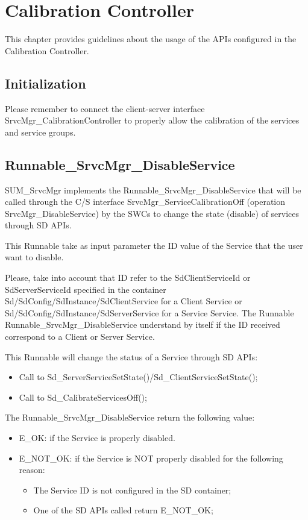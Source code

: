 \chapter{Calibration Controller}
\label{CalContr}

This chapter provides guidelines about the usage of the APIs configured in the Calibration Controller.

\section{Initialization}
Please remember to connect the client-server interface SrvcMgr\_CalibrationController to properly allow the calibration of the services and service groups.

\section{Runnable\_SrvcMgr\_DisableService}
SUM\_SrvcMgr implements the Runnable\_SrvcMgr\_DisableService that will be called through the C/S interface SrvcMgr\_ServiceCalibrationOff (operation SrvcMgr\_DisableService) 
by the SWCs to change the state (disable) of services through SD APIs.

This Runnable take as input parameter the ID value of the Service that the user want to disable. 

Please, take into account that ID refer to the SdClientServiceId or SdServerServiceId specified in the container Sd/SdConfig/SdInstance/SdClientService for a Client Service or 
Sd/SdConfig/SdInstance/SdServerService for a Service Service. The Runnable Runnable\_SrvcMgr\_DisableService understand by itself if the ID received correspond to a Client or Server Service.

This Runnable will change the status of a Service through SD APIs:

\begin{itemize}
\item Call to Sd\_ServerServiceSetState()/Sd\_ClientServiceSetState();
\item Call to Sd\_CalibrateServicesOff();
\end{itemize}

The Runnable\_SrvcMgr\_DisableService return the following value: 
\begin{itemize}
\item E\_OK: if the Service is properly disabled.
\item E\_NOT\_OK: if the Service is NOT properly disabled for the following reason:
\begin{itemize}
\item The Service ID is not configured in the SD container; 
\item One of the SD APIs called return E\_NOT\_OK;
\end{itemize}
\end{itemize}

